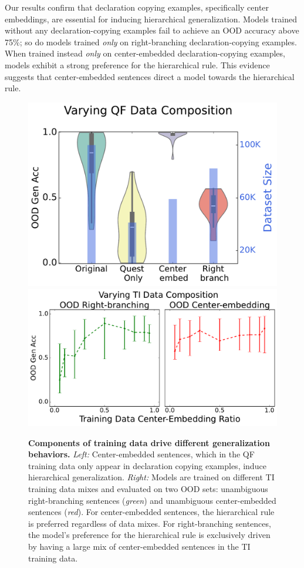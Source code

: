 Our results confirm that declaration copying examples, specifically center embeddings, are essential for inducing hierarchical generalization.
Models trained without any declaration-copying examples fail to achieve an OOD accuracy above 75\%; so do models trained \textit{only} on right-branching  declaration-copying examples. When trained instead \textit{only} on center-embedded declaration-copying examples, models exhibit a strong preference for the hierarchical rule. This evidence suggests that center-embedded sentences direct a model towards the hierarchical rule. 

\begin{figure}[t!]
    \centering
    \includegraphics[width=0.41\linewidth]{figures/no_curriculum_main.pdf}
    \includegraphics[width=0.55\linewidth]{figures/ti_simplicity_contamination.pdf}
    \caption{
    \textbf{Components of training data drive different generalization behaviors.} 
    \textit{Left:} Center-embedded sentences, which in the QF training data only appear in declaration copying examples, induce hierarchical generalization.
    \textit{Right:} Models are trained on different TI training data mixes and evaluated on two OOD sets: unambiguous right-branching sentences (\textit{green}) and unambiguous center-embedded sentences (\textit{red}). For center-embedded sentences, the hierarchical rule is preferred regardless of data mixes. For right-branching sentences, the model's preference for the hierarchical rule is exclusively driven by having a large mix of center-embedded sentences in the TI training data.}
    \label{fig:grokking_selection}
\end{figure}




